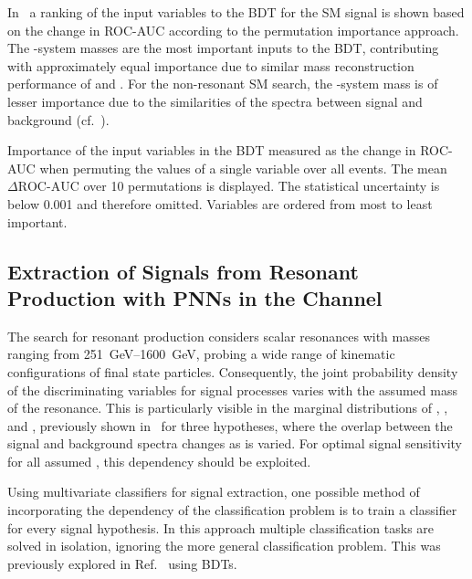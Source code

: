 In~ a ranking of the input variables
to the BDT for the SM \HH signal is shown based on the change in
ROC-AUC according to the permutation importance approach. The
\PHiggs-system masses are the most important inputs to the BDT,
contributing with approximately equal importance due to similar mass
reconstruction performance of \mMMC and \mBB. For the non-resonant SM
\HH search, the \HH-system mass is of lesser importance due to the
similarities of the \mHH spectra between signal and background
(cf.~).

\begin{table}[htbp]
  \centering

  \caption{Importance of the input variables in the BDT measured as
    the change in ROC-AUC when permuting the values of a single
    variable over all events. The mean $\Delta\text{ROC-AUC}$ over 10
    permutations is displayed. The statistical uncertainty is below
    0.001 and therefore omitted. Variables are ordered from most to
    least important.}%
  \label{tab:variable_importance_bdt}

  
\end{table}


\subsection{Extraction of Signals from Resonant \HH Production with
  PNNs in the \hadhad Channel}%
\label{sec:mva_pnn}

The search for resonant \HH production considers scalar resonances
with masses ranging from \SIrange{251}{1600}{\GeV}, probing a wide
range of kinematic configurations of final state
particles. Consequently, the joint probability density of the
discriminating variables for signal processes varies with the assumed
mass of the resonance. This is particularly visible in the marginal
distributions of \mHH, \dRtautau, and \dRbb, previously shown
in~ for three \mX hypotheses, where the overlap
between the signal and background spectra changes as \mX is
varied. For optimal signal sensitivity for all assumed \mX, this
dependency should be exploited.

Using multivariate classifiers for signal extraction, one possible
method of incorporating the \mX dependency of the classification
problem is to train a classifier for every signal hypothesis. In this
approach multiple classification tasks are solved in isolation,
ignoring the more general classification problem. This was previously
explored in Ref.~\cite{HIGG-2016-16-witherratum} using BDTs.

